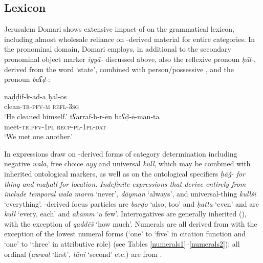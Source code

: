 \documentclass[output=paper]{langsci/langscibook}
\begin{document}
\subsection{Lexicon}

Jerusalem Domari shows extensive impact of  on the grammatical lexicon, including almost wholesale reliance on -derived material for entire categories. In the pronominal domain, Domari employs, in additional to the secondary pronominal object marker \textit{iyyā-} discussed above, also the  reflexive pronoun \textit{ḥāl-}, derived from the word ‘state’, combined with person/possessive , and the   pronoun \textit{baʕḍ-}:

\ea \gll naḍḍif-k-ad-a ḥāl-os\\
     clean-\textsc{tr-pfv-m} \textsc{refl-3sg}\\
\glt ‘He cleaned himself.’
\ex \gll tʕarraf-h-r-ēn baʕḍ-ē-man-ta\\
     meet-\textsc{tr.pfv-1pl} \textsc{recp-pl-1pl-dat}\\
\glt ‘We met one another.’
\z

In expressions draw on -derived forms of category determination including negative \textit{wala}, free choice \textit{ayy} and universal \textit{kull}, which may be combined with inherited ontological markers, as well as on the ontological specifiers \textit{ḥāǧ- \textup{for thing and} maḥall \textup{for location. Indefinite expressions that derive entirely from  include temporal} wala marra} {{‘never’,} \textit{dāyman} \textup{‘always’, and universal-thing} \textit{kullši} \textup{‘everything’. -derived} }focus particles are \textit{barḍo} ‘also, too’ and \textit{ḥatta} ‘even’ and  are \textit{kull} ‘every, each’ and \textit{akamm} ‘a few’. Interrogatives are generally inherited (), with the exception of \textit{qaddēš} ‘how much’. Numerals are all derived from  with the exception of the lowest numeral forms (`one' to `five' in citation function and `one' to `three' in attributive role) (see Tables \ref{numerals1}–\ref{numerals2}); all ordinal  (\textit{awwal} ‘first’, \textit{tāni} `second' etc.) are from .
\\
\end{document}
